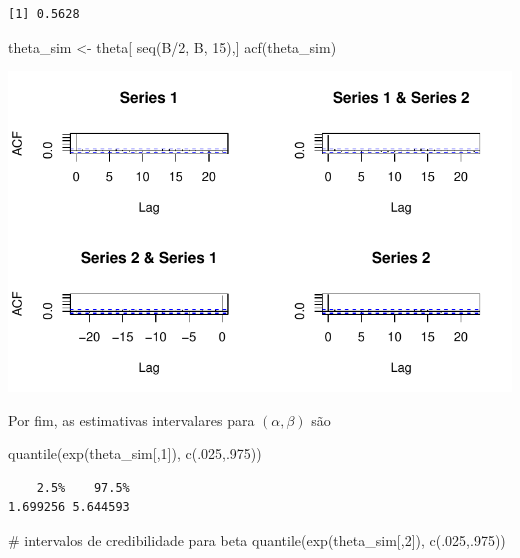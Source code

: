 \documentclass[
  letterpaper,
  DIV=11,
  numbers=noendperiod]{scrreprt}
\newenvironment{Shaded}{\begin{snugshade}}{\end{snugshade}}
\newcommand{\CommentTok}[1]{\textcolor[rgb]{0.37,0.37,0.37}{#1}}
\newcommand{\DecValTok}[1]{\textcolor[rgb]{0.68,0.00,0.00}{#1}}
\newcommand{\FunctionTok}[1]{\textcolor[rgb]{0.28,0.35,0.67}{#1}}
\newcommand{\NormalTok}[1]{\textcolor[rgb]{0.00,0.23,0.31}{#1}}
\newcommand{\OtherTok}[1]{\textcolor[rgb]{0.00,0.23,0.31}{#1}}
\newcommand{\SpecialCharTok}[1]{\textcolor[rgb]{0.37,0.37,0.37}{#1}}
\theoremstyle{definition}
\theoremstyle{definition}
\theoremstyle{plain}
\theoremstyle{remark}
\begin{document}
\begin{verbatim}
[1] 0.5628
\end{verbatim}

\begin{Shaded}
\begin{Highlighting}[]
\NormalTok{theta\_sim }\OtherTok{\textless{}{-}}\NormalTok{ theta[ }\FunctionTok{seq}\NormalTok{(B}\SpecialCharTok{/}\DecValTok{2}\NormalTok{, B, }\DecValTok{15}\NormalTok{),]}
\FunctionTok{acf}\NormalTok{(theta\_sim)}
\end{Highlighting}
\end{Shaded}

\includegraphics{aproximacaoNormal_files/figure-pdf/unnamed-chunk-8-1.pdf}

Por fim, as estimativas intervalares para \((\alpha,\beta)\) são

\begin{Shaded}
\begin{Highlighting}[]
\FunctionTok{quantile}\NormalTok{(}\FunctionTok{exp}\NormalTok{(theta\_sim[,}\DecValTok{1}\NormalTok{]), }\FunctionTok{c}\NormalTok{(.}\DecValTok{025}\NormalTok{,.}\DecValTok{975}\NormalTok{))}
\end{Highlighting}
\end{Shaded}

\begin{verbatim}
    2.5%    97.5% 
1.699256 5.644593 
\end{verbatim}

\begin{Shaded}
\begin{Highlighting}[]
\CommentTok{\# intervalos de credibilidade para beta}
\FunctionTok{quantile}\NormalTok{(}\FunctionTok{exp}\NormalTok{(theta\_sim[,}\DecValTok{2}\NormalTok{]), }\FunctionTok{c}\NormalTok{(.}\DecValTok{025}\NormalTok{,.}\DecValTok{975}\NormalTok{))}
\end{Highlighting}
\end{Shaded}
\end{document}
